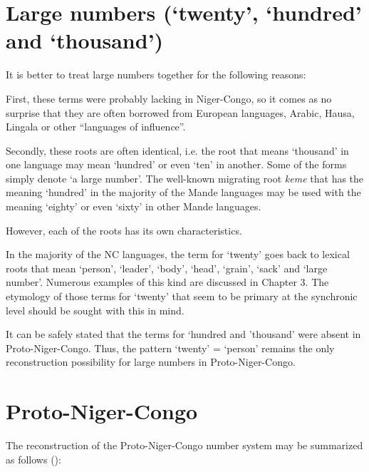 \clearpage
\section{Large numbers (‘twenty’, ‘hundred’ and ‘thousand’)}%

It is better to treat large numbers together for the following reasons:

First, these terms were probably lacking in Niger-Congo, so it comes as no surprise that they are often borrowed from European languages, Arabic, Hausa, Lingala or other “languages of influence”.    

Secondly, these roots are often identical, i.e. the root that means ‘thousand’ in one language may mean ‘hundred’ or even ‘ten’ in another. Some of the forms simply denote ‘a large number’. The well-known migrating root \textit{keme} that has the meaning ‘hundred’ in the majority of the Mande languages may be used with the meaning ‘eighty’ or even ‘sixty’ in other Mande languages.

However, each of the roots has its own characteristics.

In the majority of the NC languages, the term for ‘twenty’ goes back to lexical roots that mean ‘person’, ‘leader’, ‘body’, ‘head’, ‘grain’, ‘sack’ and ‘large number’. Numerous examples of this kind are discussed in Chapter 3. The etymology of those terms for ‘twenty’ that seem to be primary at the synchronic level should be sought with this in mind.

It can be safely stated that the terms for ‘hundred and ’thousand’ were absent in Proto-Niger-Congo. Thus, the pattern ‘twenty’ = ‘person’ remains the only reconstruction possibility for large numbers in Proto-Niger-Congo.

\clearpage
\section{Proto-Niger-Congo}%

The reconstruction of the Proto-Niger-Congo number system may be summarized as follows ():

